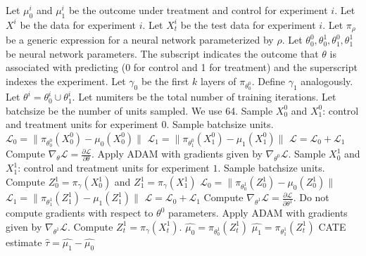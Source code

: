 \begin{algorithm}[H]
	\caption{Frozen Features T-learner}
	\label{alg:frozen-t}
	\begin{algorithmic}[1]
		\State Let $\mu^{i}_0$ and $\mu^{i}_1$ be the outcome under treatment and control for experiment $i$. 
		\State Let $X^i$ be the data for experiment $i$. Let $X^i_t$ be the test data for experiment $i$. 
		\State Let $\pi_\rho$ be a generic expression for a neural network parameterized by $\rho$. 
		\State Let $\theta_0^0, \theta_0^1, \theta_1^0, \theta_1^1$ be neural network parameters. The subscript indicates the outcome that $\theta$ is associated with predicting (0 for control and 1 for treatment) and the superscript indexes the experiment.
		\State Let $\gamma_0$ be the first $k$ layers of $\pi_{\theta^0_0}$. Define $\gamma_1$ analogously. 
		\State Let $\theta^i = \theta^i_0 \cup \theta^i_1$. 
		\State Let numiters be the total number of training iterations.
		\State Let batchsize be the number of units sampled. We use 64. 
		\State Sample $X^0_0$ and $X^0_1$: control and treatment units for experiment $0$. Sample batchsize units.  
		\State $\mathcal{L}_0= \| \pi_{\theta^0_0} (X^0_0) - \mu_0(X^0_0) \| $
		\State $\mathcal{L}_1 = \| \pi_{\theta^0_1} (X^0_1) - \mu_1(X^0_1) \| $
		\State $\mathcal{L} = \mathcal{L}_0 + \mathcal{L}_1$
		\State Compute $\nabla_{\theta} \mathcal{L} = \frac{\partial \mathcal{L}}{\partial \theta}$.
		\State Apply ADAM with gradients given by $\nabla_{\theta^0} \mathcal{L}$. 
		\EndFor
		\State Sample $X^1_0$ and $X^1_1$: control and treatment units for experiment $1$. Sample batchsize units. 
		\State Compute $Z^1_0 = \pi_\gamma(X^1_0)$ and $Z^1_1 = \pi_\gamma(X^1_1)$
		\State $\mathcal{L}_0= \| \pi_{\theta_0^1} (Z^1_0) - \mu_0(Z^1_0) \| $
		\State $\mathcal{L}_1 = \| \pi_{\theta_1^1} (Z^1_1) - \mu_1(Z^1_1) \| $
		\State $\mathcal{L} = \mathcal{L}_0 + \mathcal{L}_1$
		\State Compute $\nabla_{\theta^1} \mathcal{L} = \frac{\partial \mathcal{L}}{\partial \theta^1}$. Do not compute gradients with respect to $\theta^0$ parameters. 
		\State Apply ADAM with gradients given by $\nabla_{\theta^1} \mathcal{L}$. 
		\EndFor
		\State Compute $Z^1_t = \pi_\gamma(X^1_t)$. 
		\State $\hat{\mu_0} = \pi_{\theta^1_0} (Z^1_t)$
		\State $\hat{\mu_1} = \pi_{\theta^1_1} (Z^1_t)$
		 CATE estimate $\hat{\tau} = \hat{\mu_1} - \hat{\mu_0}$
	\end{algorithmic}
\end{algorithm}


